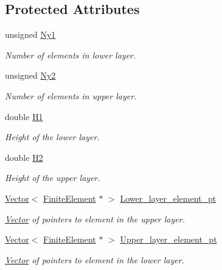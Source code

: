 \subsection*{Protected Attributes}
\begin{DoxyCompactItemize}
\item 
unsigned \hyperlink{classoomph_1_1TwoLayerSpineMesh_a614e800b8c5ba2963254e7e41bcfc9e2}{Ny1}
\begin{DoxyCompactList}\small\item\em Number of elements in lower layer. \end{DoxyCompactList}\item 
unsigned \hyperlink{classoomph_1_1TwoLayerSpineMesh_a48a69edc318571675eed16c9154235e3}{Ny2}
\begin{DoxyCompactList}\small\item\em Number of elements in upper layer. \end{DoxyCompactList}\item 
double \hyperlink{classoomph_1_1TwoLayerSpineMesh_ad98f7a291c592042279f0498ea3ec5c9}{H1}
\begin{DoxyCompactList}\small\item\em Height of the lower layer. \end{DoxyCompactList}\item 
double \hyperlink{classoomph_1_1TwoLayerSpineMesh_a0a7e5f7297ad653440d7d833c89d1b44}{H2}
\begin{DoxyCompactList}\small\item\em Height of the upper layer. \end{DoxyCompactList}\item 
\hyperlink{classoomph_1_1Vector}{Vector}$<$ \hyperlink{classoomph_1_1FiniteElement}{Finite\+Element} $\ast$ $>$ \hyperlink{classoomph_1_1TwoLayerSpineMesh_aaadaab14aab4d597dab78758a1a93ad8}{Lower\+\_\+layer\+\_\+element\+\_\+pt}
\begin{DoxyCompactList}\small\item\em \hyperlink{classoomph_1_1Vector}{Vector} of pointers to element in the upper layer. \end{DoxyCompactList}\item 
\hyperlink{classoomph_1_1Vector}{Vector}$<$ \hyperlink{classoomph_1_1FiniteElement}{Finite\+Element} $\ast$ $>$ \hyperlink{classoomph_1_1TwoLayerSpineMesh_a7ea2169026ec75ecf1d727f022311b65}{Upper\+\_\+layer\+\_\+element\+\_\+pt}
\begin{DoxyCompactList}\small\item\em \hyperlink{classoomph_1_1Vector}{Vector} of pointers to element in the lower layer. \end{DoxyCompactList}\item 

\end{DoxyCompactItemize}
